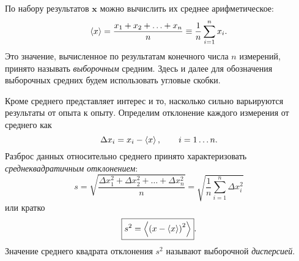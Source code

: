 
По набору результатов $\mathbf{x}$ можно вычислить их среднее арифметическое:
\begin{equation}
 \left<x\right>=\frac{x_{1}+x_{2}+\ldots+x_{n}}{n}\equiv\frac{1}{n}\sum\limits
_{i=1}^{n}x_{i}\label{eq:average}.
\end{equation}
Это значение, вычисленное по результатам конечного числа $n$ измерений,
принято называть \emph{выборочным} средним. Здесь и далее для обозначения
выборочных средних будем использовать угловые скобки.


Кроме среднего представляет интерес и то, насколько сильно варьируются
результаты от опыта к опыту. Определим отклонение каждого измерения от среднего как
\[
\Delta x_{i}=x_{i}-\left<x\right>,\qquad i=1\ldots n.
\]
Разброс данных относительно среднего принято характеризовать
\emph{среднеквадратичным отклонением}:
\begin{equation}
s=\sqrt{\frac{\Delta x_{1}^{2}+\Delta x_{2}^{2}+\ldots+\Delta
x_{n}^{2}}{n}}=\sqrt{\frac{1}{n}\sum\limits _{i=1}^{n}\Delta
x_{i}^{2}}\label{eq:sigma}
\end{equation}
или кратко
\begin{equation}
\boxed{s^{2}=\left<\left(x-\left<x\right>\right)^{2}\right>}.\label{eq:sigma_s}
\end{equation}
Значение среднего квадрата отклонения $s^{2}$ называют
выборочной \emph{дисперсией}.

%

